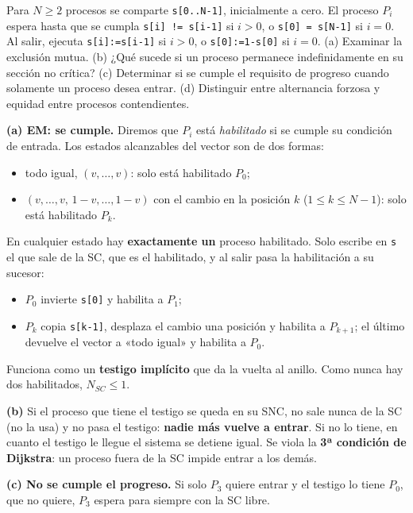 \documentclass[11pt,a4paper,oneside]{report}
\begin{document}
\begin{ejercicio}
Para $N \ge 2$ procesos se comparte \texttt{s[0..N-1]}, inicialmente a cero. El proceso $P_i$ espera hasta que se
cumpla \texttt{s[i] != s[i-1]} si $i > 0$, o \texttt{s[0] = s[N-1]} si $i = 0$. Al salir, ejecuta
\texttt{s[i]:=s[i-1]} si $i > 0$, o \texttt{s[0]:=1-s[0]} si $i = 0$. (a) Examinar la exclusión mutua. (b) ¿Qué
sucede si un proceso permanece indefinidamente en su sección no crítica? (c) Determinar si se cumple el
requisito de progreso cuando solamente un proceso desea entrar. (d) Distinguir entre alternancia forzosa y
equidad entre procesos contendientes.
\end{ejercicio}
\begin{solucion}
\textbf{(a) EM: se cumple.} Diremos que $P_i$ está \emph{habilitado} si se cumple su condición de entrada. Los
estados alcanzables del vector son de dos formas:
\begin{itemize}[leftmargin=*,noitemsep]
  \item todo igual, $(v,\dots,v)$: solo está habilitado $P_0$;
  \item $(v,\dots,v,\,1-v,\dots,1-v)$ con el cambio en la posición $k$ ($1 \le k \le N-1$): solo está habilitado
        $P_k$.
\end{itemize}
En cualquier estado hay \textbf{exactamente un} proceso habilitado. Solo escribe en \texttt{s} el que sale de la
SC, que es el habilitado, y al salir pasa la habilitación a su sucesor:
\begin{itemize}[leftmargin=*,noitemsep]
  \item $P_0$ invierte \texttt{s[0]} y habilita a $P_1$;
  \item $P_k$ copia \texttt{s[k-1]}, desplaza el cambio una posición y habilita a $P_{k+1}$; el último devuelve el
        vector a «todo igual» y habilita a $P_0$.
\end{itemize}
Funciona como un \textbf{testigo implícito} que da la vuelta al anillo. Como nunca hay dos habilitados,
$N_{SC} \le 1$.

\textbf{(b)} Si el proceso que tiene el testigo se queda en su SNC, no sale nunca de la SC (no la usa) y no pasa el
testigo: \textbf{nadie más vuelve a entrar}. Si no lo tiene, en cuanto el testigo le llegue el sistema se detiene
igual. Se viola la \textbf{3ª condición de Dijkstra}: un proceso fuera de la SC impide entrar a los demás.

\textbf{(c) No se cumple el progreso.} Si solo $P_3$ quiere entrar y el testigo lo tiene $P_0$, que no quiere, $P_3$
espera para siempre con la SC libre.


\end{solucion}
\end{document}
